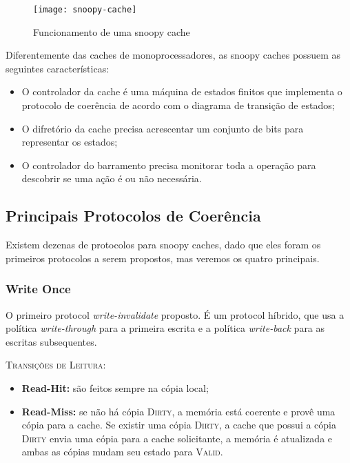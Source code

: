 \begin{figure}
  \centering
  \texttt{[image: snoopy-cache]}
  \label{fig:snoopy-cache}
  \caption{Funcionamento de uma snoopy cache}
\end{figure}

Diferentemente das caches de monoprocessadores, as snoopy caches possuem as seguintes características:
\begin{itemize}
  \item O controlador da cache é uma máquina de estados finitos que implementa o protocolo de coerência de acordo com o diagrama de transição de estados;

  \item O difretório da cache precisa acrescentar um conjunto de bits para representar os estados;

  \item O controlador do barramento precisa monitorar toda a operação para descobrir se uma ação é ou não necessária.
\end{itemize}




\subsection{Principais Protocolos de Coerência}
Existem dezenas de protocolos para snoopy caches, dado que eles foram os primeiros protocolos a serem propostos, mas veremos os quatro principais.


\subsubsection{Write Once}
O primeiro protocol \textit{write-invalidate} proposto. É um protocol híbrido, que usa a política \textit{write-through} para a primeira escrita e a política \textit{write-back} para as escritas subsequentes.

\textsc{Transições de Leitura:}
\begin{itemize}
  \item \textbf{Read-Hit:} são feitos sempre na cópia local;

  \item \textbf{Read-Miss:} se não há cópia \textsc{Dirty}, a memória está coerente e provê uma cópia para a cache. Se existir uma cópia \textsc{Dirty}, a cache que possui a cópia \textsc{Dirty} envia uma cópia para a cache solicitante, a memória é atualizada e ambas as cópias mudam seu estado para \textsc{Valid}.
\end{itemize}

